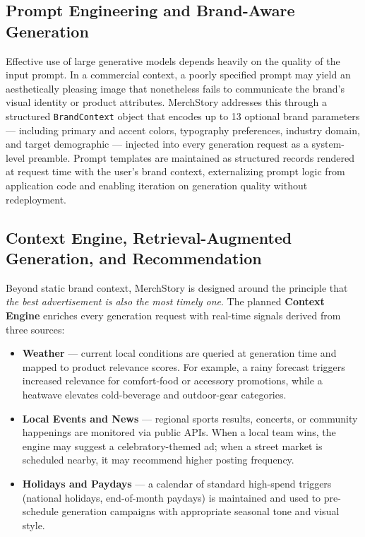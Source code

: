 \documentclass[12pt, a4paper]{report}
\begin{document}
\subsection{Prompt Engineering and Brand-Aware Generation}

Effective use of large generative models depends heavily on the quality of
the input prompt.  In a commercial context, a poorly specified prompt may
yield an aesthetically pleasing image that nonetheless fails to communicate
the brand's visual identity or product attributes.  MerchStory addresses this through a structured \texttt{BrandContext} object
that encodes up to 13 optional brand parameters --- including primary and
accent colors, typography preferences, industry domain, and target demographic
--- injected into every generation request as a system-level preamble.
Prompt templates are maintained as structured records rendered at request time
with the user's brand context, externalizing prompt logic from application code
and enabling iteration on generation quality without redeployment.

\subsection{Context Engine, Retrieval-Augmented Generation, and Recommendation}

Beyond static brand context, MerchStory is designed around the principle that
\emph{the best advertisement is also the most timely one}.  The planned
\textbf{Context Engine} enriches every generation request with real-time
signals derived from three sources:

\begin{itemize}[leftmargin=*]
  \item \textbf{Weather} --- current local conditions are queried at generation
    time and mapped to product relevance scores.  For example, a rainy forecast
    triggers increased relevance for comfort-food or accessory promotions, while
    a heatwave elevates cold-beverage and outdoor-gear categories.

  \item \textbf{Local Events and News} --- regional sports results, concerts,
    or community happenings are monitored via public APIs.  When a local team
    wins, the engine may suggest a celebratory-themed ad; when a street market
    is scheduled nearby, it may recommend higher posting frequency.

  \item \textbf{Holidays and Paydays} --- a calendar of standard high-spend
    triggers (national holidays, end-of-month paydays) is maintained and used
    to pre-schedule generation campaigns with appropriate seasonal tone and
    visual style.
\end{itemize}
\end{document}
